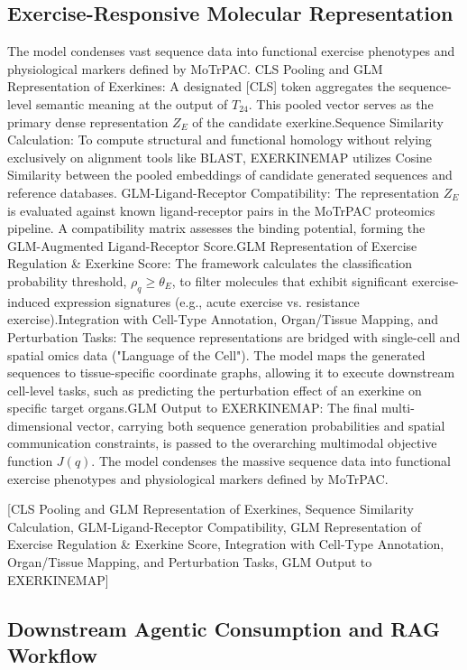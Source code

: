 \documentclass[11pt]{article}
\begin{document}
\subsection{Exercise-Responsive Molecular Representation}
The model condenses vast sequence data into functional exercise phenotypes and physiological markers defined by MoTrPAC. CLS Pooling and GLM Representation of Exerkines: A designated [CLS] token aggregates the sequence-level semantic meaning at the output of $T_{24}$. This pooled vector serves as the primary dense representation $Z_E$ of the candidate exerkine.Sequence Similarity Calculation: To compute structural and functional homology without relying exclusively on alignment tools like BLAST, EXERKINEMAP utilizes Cosine Similarity between the pooled embeddings of candidate generated sequences and reference databases. GLM-Ligand-Receptor Compatibility: The representation $Z_E$ is evaluated against known ligand-receptor pairs in the MoTrPAC proteomics pipeline. A compatibility matrix assesses the binding potential, forming the GLM-Augmented Ligand-Receptor Score.GLM Representation of Exercise Regulation \& Exerkine Score: The framework calculates the classification probability threshold, $\rho_q \ge \theta_E$, to filter molecules that exhibit significant exercise-induced expression signatures (e.g., acute exercise vs. resistance exercise).Integration with Cell-Type Annotation, Organ/Tissue Mapping, and Perturbation Tasks: The sequence representations are bridged with single-cell and spatial omics data ("Language of the Cell"). The model maps the generated sequences to tissue-specific coordinate graphs, allowing it to execute downstream cell-level tasks, such as predicting the perturbation effect of an exerkine on specific target organs.GLM Output to EXERKINEMAP: The final multi-dimensional vector, carrying both sequence generation probabilities and spatial communication constraints, is passed to the overarching multimodal objective function $J(q)$. The model condenses the massive sequence data into functional exercise phenotypes and physiological markers defined by MoTrPAC.

[CLS Pooling and GLM Representation of Exerkines, Sequence Similarity Calculation, GLM-Ligand-Receptor Compatibility, GLM Representation of Exercise Regulation \& Exerkine Score, Integration with Cell-Type Annotation, Organ/Tissue Mapping, and Perturbation Tasks, GLM Output to EXERKINEMAP]

\subsection{Downstream Agentic Consumption and RAG Workflow}
\end{document}
